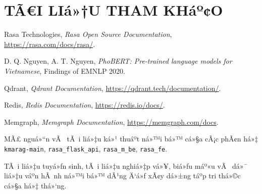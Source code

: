 ﻿\documentclass[12pt,a4paper]{report}
\renewcommand{\baselinestretch}{1.25}
\begin{document}
\clearpage
\chapter*{TÃ€I LIá»†U THAM KHáº¢O}
{}

\begingroup
\footnotesize
\renewcommand{\baselinestretch}{1.0}\selectfont
\setlength{\parskip}{0pt}
\setlength{\itemsep}{1pt}
\setlength{\parsep}{0pt}
\setlength{\topsep}{2pt}
\begin{enumerate}[leftmargin=1.2cm,label={[\arabic*]},itemsep=1pt,topsep=2pt]
\item Rasa Technologies, \textit{Rasa Open Source Documentation}, \url{https://rasa.com/docs/rasa/}.
\item D. Q. Nguyen, A. T. Nguyen, \textit{PhoBERT: Pre-trained language models for Vietnamese}, Findings of EMNLP 2020.
\item Qdrant, \textit{Qdrant Documentation}, \url{https://qdrant.tech/documentation/}.
\item Redis, \textit{Redis Documentation}, \url{https://redis.io/docs/}.
\item Memgraph, \textit{Memgraph Documentation}, \url{https://memgraph.com/docs}.
\item MÃ£ nguá»“n vÃ  tÃ i liá»‡u ká»¹ thuáº­t ná»™i bá»™ cá»§a cÃ¡c phÃ¢n há»‡ \texttt{kmarag-main}, \texttt{rasa\_flask\_api}, \texttt{rasa\_m\_be}, \texttt{rasa\_fe}.
\item TÃ i liá»‡u tuyá»ƒn sinh, tÃ i liá»‡u nghiá»‡p vá»¥, biá»ƒu máº«u vÃ  dá»¯ liá»‡u váº­n hÃ nh ná»™i bá»™ dÃ¹ng Ä‘á»ƒ xÃ¢y dá»±ng táº­p tri thá»©c cá»§a há»‡ thá»‘ng.
\end{enumerate}
\endgroup
\end{document}
